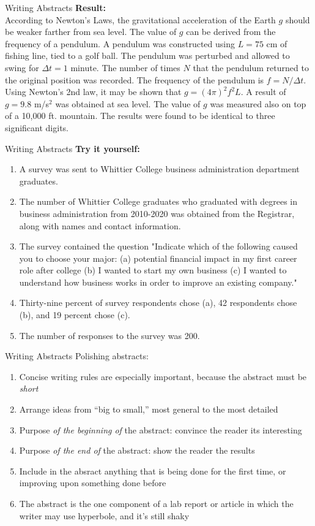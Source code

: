 \documentclass{beamer}
\begin{document}
\begin{frame}{Writing Abstracts}
\small
\textbf{Result:} \\
According to Newton's Laws, the gravitational acceleration of the Earth $g$ should be weaker farther from sea level.  The value of $g$ can be derived from the frequency of a pendulum.  A pendulum was constructed using $L = 75$ cm of fishing line, tied to a golf ball.  The pendulum was perturbed and allowed to swing for $\Delta t = 1$ minute.  The number of times $N$ that the pendulum returned to the original position was recorded.  The frequency of the pendulum is $f = N/\Delta t$.  Using Newton's 2nd law, it may be shown that $g = (4\pi)^2 f^2 L$.  A result of $g = 9.8$ m/s$^2$ was obtained at sea level.  The value of $g$ was measured also on top of a 10,000 ft. mountain.  The results were found to be identical to three significant digits.
\end{frame}

\begin{frame}{Writing Abstracts}
\small
\textbf{Try it yourself:}
\begin{enumerate}
\item A survey was sent to Whittier College business administration department graduates.
\item The number of Whittier College graduates who graduated with degrees in business administration from 2010-2020 was obtained from the Registrar, along with names and contact information.
\item The survey contained the question "Indicate which of the following caused you to choose your major: (a) potential financial impact in my first career role after college (b) I wanted to start my own business (c) I wanted to understand how business works in order to improve an existing company."
\item Thirty-nine percent of survey respondents chose (a), 42 respondents chose (b), and 19 percent chose (c).
\item The number of responses to the survey was 200.
\end{enumerate}
\end{frame}

\begin{frame}{Writing Abstracts}
Polishing abstracts:
\begin{enumerate}
\item Concise writing rules are especially important, because the abstract must be \textit{short}
\item Arrange ideas from ``big to small,'' most general to the most detailed
\item Purpose \textit{of the beginning of} the abstract: convince the reader its interesting
\item Purpose \textit{of the end of} the abstract: show the reader the results
\item Include in the absract anything that is being done for the first time, or improving upon something done before
\item The abstract is the one component of a lab report or article in which the writer may use hyperbole, and it's still shaky
\end{enumerate}
\end{frame}
\end{document}
